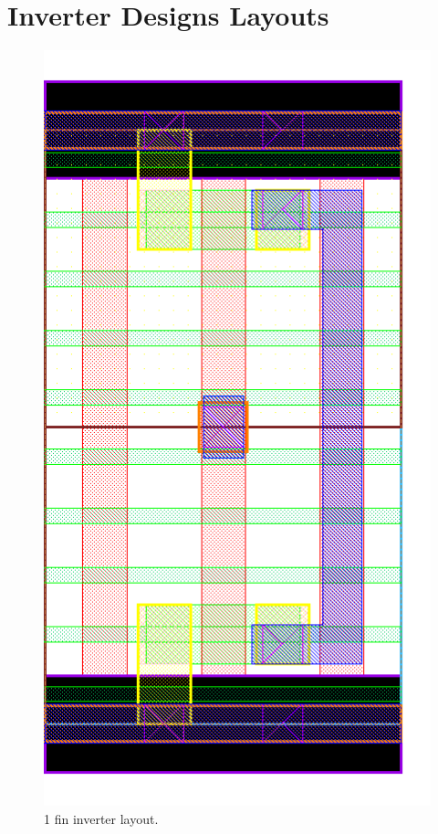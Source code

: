 \documentclass[pgmicro,mestrado,english]{iiufrgs}
\begin{document}



\annex
\chapter{Inverter Designs Layouts}

\begin{figure}[H]
\centering
\includegraphics[width=\textwidth,height=\textheight,keepaspectratio]{INV1F.png}
\caption{1 fin inverter layout.}
\label{fig:INV1F}
\end{figure}
\end{document}
